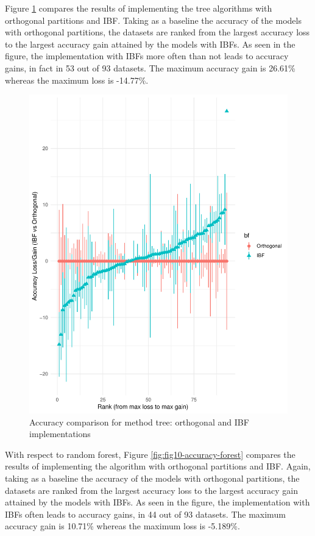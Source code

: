 \documentclass[]{elsarticle} %
\makeatletter
\def\maxwidth{\ifdim\Gin@nat@width>\linewidth\linewidth
\else\Gin@nat@width\fi}
\let\Oldincludegraphics\includegraphics
\renewcommand{\includegraphics}[1]{\Oldincludegraphics[width=\maxwidth]{#1}}
\makeatother
\begin{document}
Figure \ref{fig:fig9-accuracy-tree} compares the results of implementing
the tree algorithms with orthogonal partitions and IBF. Taking as a
baseline the accuracy of the models with orthogonal partitions, the
datasets are ranked from the largest accuracy loss to the largest
accuracy gain attained by the models with IBFs. As seen in the figure,
the implementation with IBFs more often than not leads to accuracy
gains, in fact in 53 out of 93 datasets. The maximum accuracy gain is
26.61\% whereas the maximum loss is -14.77\%.

\begin{figure}
\centering
\includegraphics{Trees_with_Base_Functions_v2_files/figure-latex/fig9-accuracy-tree-1.pdf}
\caption{\label{fig:fig9-accuracy-tree}Accuracy comparison for method
tree: orthogonal and IBF implementations}
\end{figure}

With respect to random forest, Figure \ref{fig:fig10-accuracy-forest}
compares the results of implementing the algorithm with orthogonal
partitions and IBF. Again, taking as a baseline the accuracy of the
models with orthogonal partitions, the datasets are ranked from the
largest accuracy loss to the largest accuracy gain attained by the
models with IBFs. As seen in the figure, the implementation with IBFs
often leads to accuracy gains, in 44 out of 93 datasets. The maximum
accuracy gain is 10.71\% whereas the maximum loss is -5.189\%.
\end{document}
